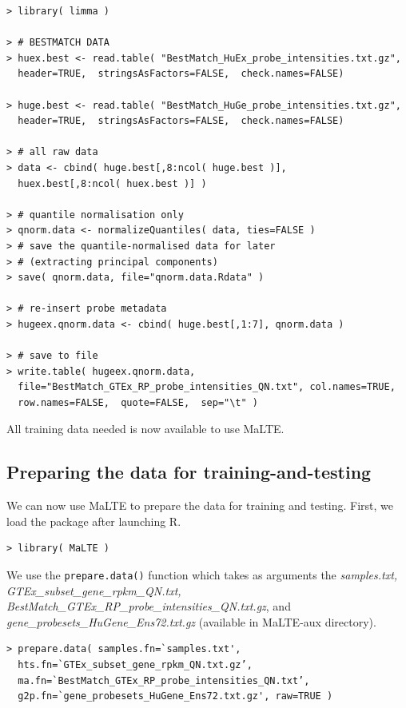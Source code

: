 \documentclass[a4paper,12pt]{article}
\begin{document}
\begin{verbatim}
> library( limma )

> # BESTMATCH DATA
> huex.best <- read.table( "BestMatch_HuEx_probe_intensities.txt.gz", 
  header=TRUE,  stringsAsFactors=FALSE,  check.names=FALSE)

> huge.best <- read.table( "BestMatch_HuGe_probe_intensities.txt.gz", 
  header=TRUE,  stringsAsFactors=FALSE,  check.names=FALSE)

> # all raw data
> data <- cbind( huge.best[,8:ncol( huge.best )], 
  huex.best[,8:ncol( huex.best )] )

> # quantile normalisation only
> qnorm.data <- normalizeQuantiles( data, ties=FALSE )
> # save the quantile-normalised data for later 
> # (extracting principal components)
> save( qnorm.data, file="qnorm.data.Rdata" )

> # re-insert probe metadata
> hugeex.qnorm.data <- cbind( huge.best[,1:7], qnorm.data )

> # save to file
> write.table( hugeex.qnorm.data, 
  file="BestMatch_GTEx_RP_probe_intensities_QN.txt", col.names=TRUE, 
  row.names=FALSE,  quote=FALSE,  sep="\t" )
\end{verbatim}

All training data needed is now available to use \textsf{MaLTE}.

\subsection{Preparing the data for training-and-testing}
\label{usecase:preparing}

We can now use \textsf{MaLTE} to prepare the data for training and testing. First, we load the package after launching \textsf{R}.

\begin{verbatim}
> library( MaLTE )
\end{verbatim}

We use the \texttt{prepare.data()} function which takes as arguments the \textit{samples.txt,\\ GTEx\_subset\_gene\_rpkm\_QN.txt, BestMatch\_GTEx\_RP\_probe\_intensities\_QN.txt.gz}, and\\ \textit{gene\_probesets\_HuGene\_Ens72.txt.gz} (available in \textsf{MaLTE-aux} directory).

\begin{verbatim}
> prepare.data( samples.fn=`samples.txt', 
  hts.fn=`GTEx_subset_gene_rpkm_QN.txt.gz’,
  ma.fn=`BestMatch_GTEx_RP_probe_intensities_QN.txt’,
  g2p.fn=`gene_probesets_HuGene_Ens72.txt.gz', raw=TRUE )
\end{verbatim}
\end{document}

